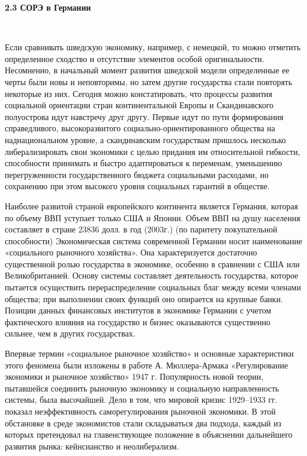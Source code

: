 \documentclass[14pt,a4paper]{article}
\begin{document}
    \begin{center}
        \textbf{2.3 СОРЭ в Германии}
    \end{center}
    \\
    \par
    Если сравнивать шведскую экономику, например, с немецкой, то можно отметить определенное сходство и отсутствие элементов особой оригинальности.
    Несомненно, в начальный момент развития шведской модели определенные ее черты были новы и неповторимы, но затем другие государства стали повторять некоторые из них.
    Сегодня можно констатировать, что процессы развития социальной ориентации стран континентальной Европы и Скандинавского полуострова идут навстречу друг другу.
    Первые идут по пути формирования справедливого, высокоразвитого социально-ориентированного общества на наднациональном уровне, а скандинавским государствам пришлось несколько либерализировать свои экономики с целью придания им относительной гибкости, способности принимать и быстро адаптироваться к переменам, уменьшению перегруженности государственного бюджета социальными расходами, но сохранению при этом высокого уровня социальных гарантий в обществе.
    \par
    Наиболее развитой страной европейского континента является Германия, которая по объему ВВП уступает только США и Японии.
    Объем ВВП на душу населения составляет в стране 23836 долл. в год (2003г.) (по паритету покупательной способности) Экономическая система современной Германии носит наименование «социального рыночного хозяйства».
    Она характеризуется достаточно существенной ролью государства в экономике, особенно в сравнении с США или Великобританией.
    Основу системы составляет деятельность государства, которое пытается осуществить перераспределение социальных благ между всеми членами общества; при выполнении своих функций оно опирается на крупные банки.
    Позиции данных финансовых институтов в экономике Германии с учетом фактического влияния на государство и бизнес оказываются существенно сильнее, чем в других государствах.
    \par
    Впервые термин «социальное рыночное хозяйство» и основные характеристики этого феномена были изложены в работе А. Мюллера-Армака «Регулирование экономики и рыночное хозяйство» 1947 г.
    Популярность новой теории, пытавшейся соединить рыночную экономику и социальную направленность системы, была высочайшей.
    Дело в том, что мировой кризис 1929–1933 гг. показал неэффективность саморегулирования рыночной экономики.
    В этой обстановке в среде экономистов стали складываться два подхода, каждый из которых претендовал на главенствующее положение в объяснении дальнейшего развития рынка: кейнсианство и неолиберализм.
\end{document}
